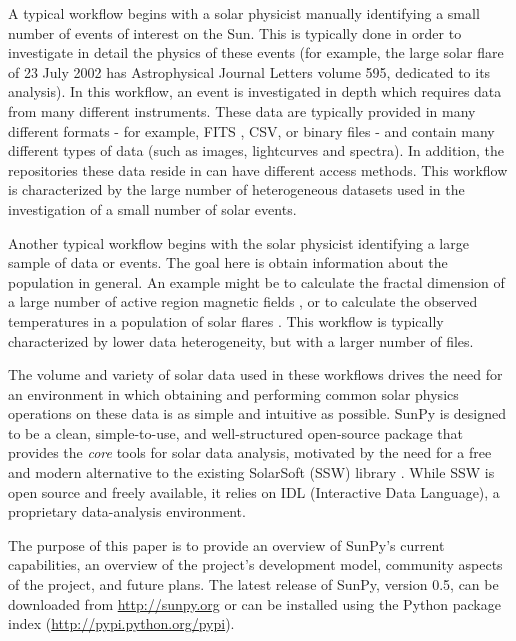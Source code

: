A typical workflow begins with a solar physicist manually identifying
a small number of events of interest on the Sun.  This is typically
done in order to investigate in detail the physics of these events
(for example, the large solar flare of 23 July 2002 has Astrophysical
Journal Letters volume 595, dedicated to its analysis).
In this workflow, an event is investigated in depth which requires 
data from many different instruments.
These data are typically provided in many different formats - for
example, FITS \citep[Flexible Image Transport System,][]{refId0}, CSV, or
binary files - and contain many different types of data (such as
images, lightcurves and spectra).  In addition, the repositories these data reside
in can have different access methods.  This workflow is characterized
by the large number of heterogeneous datasets used in the
investigation of a small number of solar events.

Another typical workflow begins with the solar physicist identifying a
large sample of data or events.  The goal here is obtain information
about the population in general.  An example might be to calculate the
fractal dimension of a large number of active region magnetic fields
\citep{2005ApJ...631..628M}, or to calculate the observed temperatures
in a population of solar flares \citep{2012ApJS..202...11R}.  This
workflow is typically characterized by lower data heterogeneity, but
with a larger number of files.

The volume and variety of solar data used in these workflows drives
the need for an environment in which obtaining and performing common
solar physics operations on these data is as simple and intuitive as
possible.  SunPy is designed to be a clean, simple-to-use, and
well-structured open-source package that provides the \textit{core}
tools for solar data analysis, motivated by the need for a free and
modern alternative to the existing SolarSoft (SSW) library
\citep{freeland1998}. While SSW is open source and freely available,
it relies on IDL (Interactive Data Language), a proprietary
data-analysis environment.

The purpose of this paper is to provide an overview of SunPy's current
capabilities, an overview of the project's development model, community aspects of the
project, and future plans. The latest release of SunPy, version 0.5,
can be downloaded from \url{http://sunpy.org} or can be
installed using the Python package index (\url{http://pypi.python.org/pypi}).
